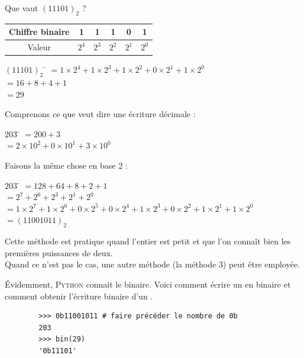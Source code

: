 \begin{methode}
    Que vaut $(11101)_2$ ?
    \begin{center}
        \alternaterowcolors[UGLiPurple]
        \begin{tabular}{|c|c|c|c|c|c|}
            \hline
            Chiffre binaire & 1     & 1     & 1     & 0     & 1     \\
            \hline
            Valeur          & $2^4$ & $2^3$ & $2^2$ & $2^1$ & $2^0$ \\
            \hline
        \end{tabular}
    \end{center}
    \begin{tabbing}
        $(11101)_2$	\= 	$=1\times 2^4+1\times 2^3+1\times 2^2+0\times 2^1+1\times 2^0$	\\
        \>	$=16+8+4+1$	\\
        \>	$=29$
    \end{tabbing}\nopagebreak
\end{methode}

\begin{methode}
    Comprenons ce que veut dire une écriture décimale :
    \begin{tabbing}
        $203$	\= 	$=200+3$	\\

        \>	$=2\times 10^2+0\times 10^1+3\times 10^0$
    \end{tabbing}
    Faisons la même chose en base 2 :
    \begin{tabbing}
        $203$	\= 	$=128+64+8+2+1$	\\

        \>	$=2^7+2^6+2^3+2^1+2^0$	\\

        \>	$=1\times 2^7+1\times 2^6+0\times 2^5 + 0\times 2^4 +1\times 2^3+0\times 2^2 + 1\times
            2^1+1\times 2^0$	\\

        \> $=(11001011)_2$
    \end{tabbing}
    Cette méthode est pratique quand l'entier est petit et que l'on connaît bien les premières puissances de deux.\\
    Quand ce n'est pas le cas, une autre méthode (la méthode 3) peut être employée.

\end{methode}
\'Evidemment, \textsc{Python} connait le binaire. Voici comment écrire un  en binaire et comment obtenir l'écriture
binaire d'un .
\begin{pys}
    \begin{verbatim}
        >>> 0b11001011 # faire précéder le nombre de 0b
        203
        >>> bin(29)
        '0b11101'
    \end{verbatim}
\end{pys}

